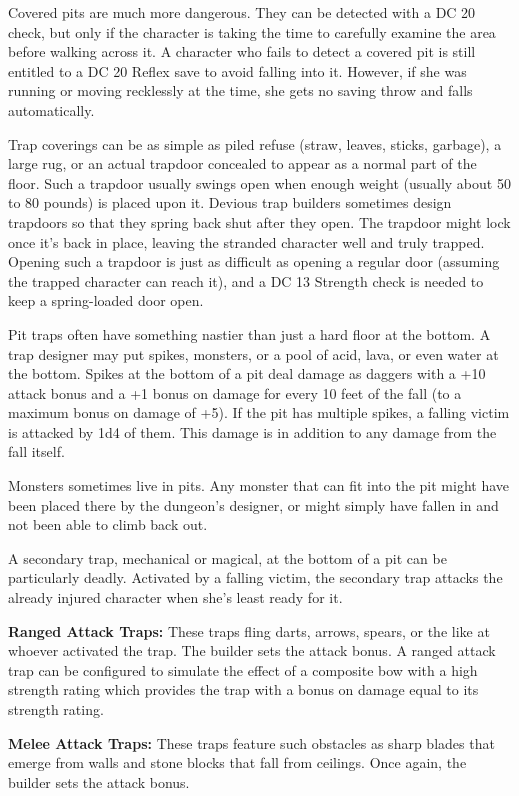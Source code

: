Covered pits are much more dangerous. They can be detected with a DC 20  check, but only if the character is taking the time to carefully examine the area before walking across it. A character who fails to detect a covered pit is still entitled to a DC 20 Reflex save to avoid falling into it. However, if she was running or moving recklessly at the time, she gets no saving throw and falls automatically.

Trap coverings can be as simple as piled refuse (straw, leaves, sticks, garbage), a large rug, or an actual trapdoor concealed to appear as a normal part of the floor. Such a trapdoor usually swings open when enough weight (usually about 50 to 80 pounds) is placed upon it. Devious trap builders sometimes design trapdoors so that they spring back shut after they open. The trapdoor might lock once it’s back in place, leaving the stranded character well and truly trapped. Opening such a trapdoor is just as difficult as opening a regular door (assuming the trapped character can reach it), and a DC 13 Strength check is needed to keep a spring-loaded door open.

Pit traps often have something nastier than just a hard floor at the bottom. A trap designer may put spikes, monsters, or a pool of acid, lava, or even water at the bottom. Spikes at the bottom of a pit deal damage as daggers with a +10 attack bonus and a +1 bonus on damage for every 10 feet of the fall (to a maximum bonus on damage of +5). If the pit has multiple spikes, a falling victim is attacked by 1d4 of them. This damage is in addition to any damage from the fall itself.

Monsters sometimes live in pits. Any monster that can fit into the pit might have been placed there by the dungeon’s designer, or might simply have fallen in and not been able to climb back out.

A secondary trap, mechanical or magical, at the bottom of a pit can be particularly deadly. Activated by a falling victim, the secondary trap attacks the already injured character when she’s least ready for it.

\textbf{Ranged Attack Traps:} These traps fling darts, arrows, spears, or the like at whoever activated the trap. The builder sets the attack bonus. A ranged attack trap can be configured to simulate the effect of a composite bow with a high strength rating which provides the trap with a bonus on damage equal to its strength rating.

\textbf{Melee Attack Traps:} These traps feature such obstacles as sharp blades that emerge from walls and stone blocks that fall from ceilings. Once again, the builder sets the attack bonus.

